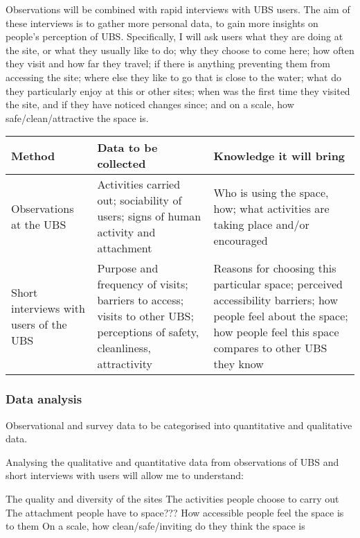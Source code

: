 \documentclass{article}
\begin{document}
Observations will be combined with rapid interviews with UBS users. The aim of these interviews is to gather more personal data, to gain more insights on people’s perception of UBS. Specifically, I will ask users what they are doing at the site, or what they usually like to do; why they choose to come here; how often they visit and how far they travel; if there is anything preventing them from accessing the site; where else they like to go that is close to the water; what do they particularly enjoy at this or other sites; when was the first time they visited the site, and if they have noticed changes since; and on a scale, how safe/clean/attractive the space is.

\begin{center}
\begin{tabularx}{\textwidth} { 
  | >{\raggedright\arraybackslash}X 
  | >{\raggedright\arraybackslash}X 
  | >{\raggedright\arraybackslash}X | }
  \hline
  Method & Data to be collected & Knowledge it will bring \\ 
     \hline
  Observations at the UBS
  & Activities carried out; sociability of users; signs of human activity and attachment
  &  Who is using the space, how; what activities are taking place and/or encouraged \\ 
  	\hline
  Short interviews with users of the UBS
  & Purpose and frequency of visits; barriers to access; visits to other UBS; perceptions of safety, cleanliness, attractivity
  & Reasons for choosing this particular space; perceived accessibility barriers; how people feel about the space; how people feel this space compares to other UBS they know \\ 
  \hline
\end{tabularx}
\end{center}

\subsubsection{Data analysis}

Observational and survey data to be categorised into quantitative and qualitative data.

Analysing the qualitative and quantitative data from observations of UBS and short interviews with users will allow me to understand:

\begin{outline}
	\1 The quality and diversity of the sites
	\1 The activities people choose to carry out
	\1 The attachment people have to space??? 
	\1 How accessible people feel the space is to them
	\1 On a scale, how clean/safe/inviting do they think the space is
\end{outline}
\end{document}
